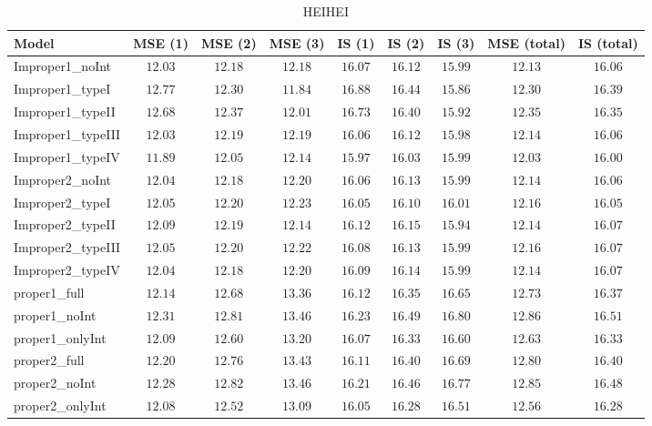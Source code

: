 \begin{table}

\caption{\label{tab:model-choice-sc6}HEIHEI}
\centering
\begin{tabular}{lcccccccc}
\hline
Model  & MSE (1) & MSE (2) & MSE (3) & IS (1) & IS (2) & IS (3) & MSE (total) & \multicolumn{1}{c}{IS (total)} \\ 
\hline
Improper1_noInt  & $12.03$ & $12.18$ & $12.18$ & $16.07$ & $16.12$ & $15.99$ & $12.13$ & $16.06$ \\
Improper1_typeI  & $12.77$ & $12.30$ & $11.84$ & $16.88$ & $16.44$ & $15.86$ & $12.30$ & $16.39$ \\
Improper1_typeII  & $12.68$ & $12.37$ & $12.01$ & $16.73$ & $16.40$ & $15.92$ & $12.35$ & $16.35$ \\
Improper1_typeIII  & $12.03$ & $12.19$ & $12.19$ & $16.06$ & $16.12$ & $15.98$ & $12.14$ & $16.06$ \\
Improper1_typeIV  & $11.89$ & $12.05$ & $12.14$ & $15.97$ & $16.03$ & $15.99$ & $12.03$ & $16.00$ \\
Improper2_noInt  & $12.04$ & $12.18$ & $12.20$ & $16.06$ & $16.13$ & $15.99$ & $12.14$ & $16.06$ \\
Improper2_typeI  & $12.05$ & $12.20$ & $12.23$ & $16.05$ & $16.10$ & $16.01$ & $12.16$ & $16.05$ \\
Improper2_typeII  & $12.09$ & $12.19$ & $12.14$ & $16.12$ & $16.15$ & $15.94$ & $12.14$ & $16.07$ \\
Improper2_typeIII  & $12.05$ & $12.20$ & $12.22$ & $16.08$ & $16.13$ & $15.99$ & $12.16$ & $16.07$ \\
Improper2_typeIV  & $12.04$ & $12.18$ & $12.20$ & $16.09$ & $16.14$ & $15.99$ & $12.14$ & $16.07$ \\
proper1_full  & $12.14$ & $12.68$ & $13.36$ & $16.12$ & $16.35$ & $16.65$ & $12.73$ & $16.37$ \\
proper1_noInt  & $12.31$ & $12.81$ & $13.46$ & $16.23$ & $16.49$ & $16.80$ & $12.86$ & $16.51$ \\
proper1_onlyInt  & $12.09$ & $12.60$ & $13.20$ & $16.07$ & $16.33$ & $16.60$ & $12.63$ & $16.33$ \\
proper2_full  & $12.20$ & $12.76$ & $13.43$ & $16.11$ & $16.40$ & $16.69$ & $12.80$ & $16.40$ \\
proper2_noInt  & $12.28$ & $12.82$ & $13.46$ & $16.21$ & $16.46$ & $16.77$ & $12.85$ & $16.48$ \\
proper2_onlyInt  & $12.08$ & $12.52$ & $13.09$ & $16.05$ & $16.28$ & $16.51$ & $12.56$ & $16.28$ \\
\hline 
\end{tabular}


\end{table}